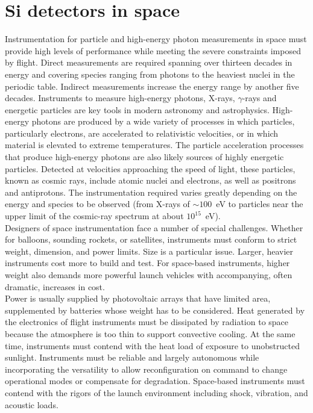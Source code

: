 
\chapter{Si detectors in space}
\label{sec:si_spazio}

Instrumentation for particle and high-energy photon measurements in space must
provide high levels of performance while meeting the severe constraints imposed
by flight. Direct measurements are required spanning over thirteen decades in
energy and covering species ranging from photons to the heaviest nuclei in the
periodic table. Indirect measurements increase the energy range by another five
decades.  Instruments to measure high-energy photons, X-rays, $\gamma$-rays and
energetic particles are key tools in modern astronomy and
astrophysics. High-energy photons are produced by a wide variety of processes in
which particles, particularly electrons, are accelerated to relativistic
velocities, or in which material is elevated to extreme temperatures. The
particle acceleration processes that produce high-energy photons are also likely
sources of highly energetic particles. Detected at velocities approaching the
speed of light, these particles, known as cosmic rays, include atomic nuclei and
electrons, as well as positrons and antiprotons. The instrumentation required
varies greatly depending on the energy and species to be observed (from X-rays
of $\sim 100$~eV to particles near the upper
limit of the cosmic-ray spectrum at about $10^{15}$~eV).\\
Designers of space instrumentation face a number of special challenges. Whether
for balloons, sounding rockets, or satellites, instruments must conform to
strict weight, dimension, and power limits. Size is a particular issue. Larger,
heavier instruments cost more to build and test. For space-based instruments,
higher weight also demands more powerful launch vehicles with accompanying,
often
dramatic, increases in cost.\\
Power is usually supplied by photovoltaic arrays that have limited area,
supplemented by batteries whose weight has to be considered. Heat generated by
the electronics of flight instruments must be dissipated by radiation to space
because the atmosphere is too thin to support convective cooling. At the same
time, instruments must contend with the heat load of exposure to unobstructed
sunlight. Instruments must be reliable and largely autonomous while
incorporating the versatility to allow reconfiguration on command to change
operational modes or compensate for degradation. Space-based instruments must
contend with the rigors of the launch environment
including shock, vibration, and acoustic loads.\\

